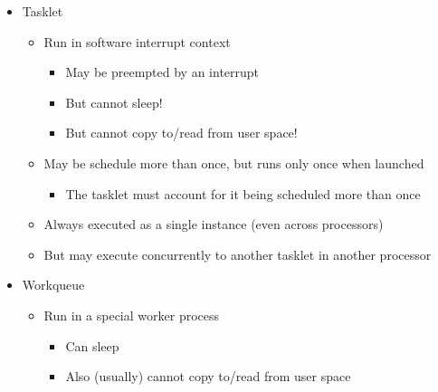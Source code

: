 \begin{frame}{\secname}
    \begin{itemize}
        \item Tasklet
        \begin{itemize}
            \item Run in software interrupt context
            \begin{itemize}
                \item May be preempted by an interrupt
                \item But cannot sleep!
                \item But cannot copy to/read from user space!
            \end{itemize}
            \item May be schedule more than once, but runs only once when launched
            \begin{itemize}
                \item The tasklet must account for it being scheduled more than once
            \end{itemize}
            \item Always executed as a single instance (even across processors)
            \item But may execute concurrently to another tasklet in another processor
        \end{itemize}
        \item Workqueue
        \begin{itemize}
            \item Run in a special worker process
            \begin{itemize}
                \item Can sleep
                \item Also (usually) cannot copy to/read from user space
            \end{itemize}
        \end{itemize}
    \end{itemize}
\end{frame}
